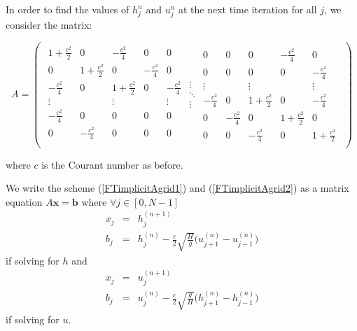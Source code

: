 \documentclass[a4paper,12pt, notitlepage]{article}
\begin{document}
In order to find the values of $h_{j}^{n}$ and $u_{j}^{n}$ at the next time iteration for all $j$, we consider the matrix:

\[
A = \left (
\begin{array}{ccc}
\begin{array}{ccccc}
1 + \frac{c^{2}}{2} & 0 & -\frac{c^{2}}{4} & 0 & 0\\
0& 1 + \frac{c^{2}}{2} & 0 & -\frac{c^{2}}{4} & 0\\
-\frac{c^{2}}{4} & 0& 1 + \frac{c^{2}}{2} & 0 & -\frac{c^{2}}{4}\\
\vdots & & \vdots & & \vdots\\
- \frac{c^{2}}{4} & 0 & 0 & 0 & 0\\
0 & - \frac{c^{2}}{4} & 0 & 0 & 0\\
\end{array}
\begin{array}{c}
\vdots\\ 
\ddots\\
\vdots
\end{array}
\begin{array}{ccccc}
0 & 0 & 0 & - \frac{c^{2}}{4} & 0\\
0 & 0 & 0 & 0 & - \frac{c^{2}}{4}\\
\vdots & & \vdots & & \vdots\\
-\frac{c^{2}}{4}& 0 & 1 + \frac{c^{2}}{2} & 0 & -\frac{c^{2}}{4} \\
0 & -\frac{c^{2}}{4} & 0 & 1 + \frac{c^{2}}{2} & 0\\
0 & 0 & -\frac{c^{2}}{4}& 0 & 1 + \frac{c^{2}}{2}
\end{array}
\end{array}
\right )
\]

where $c$ is the Courant number as before. 

We write the scheme (\ref{FTimplicitAgrid1}) and (\ref{FTimplicitAgrid2}) as a matrix equation $A \mathbf{x} = \mathbf{b}$ where $\forall j \in [0, N-1]$
\begin{eqnarray}
x_{j} & = & h_{j}^{(n+1)}\\
b_{j} & = & h_{j}^{(n)} - \frac{c}{2}\sqrt{\frac{H}{g}}\bigg(u_{j+1}^{(n)} - u_{j-1}^{(n)}\bigg)
\end{eqnarray}
if solving for $h$ and
\begin{eqnarray}
x_{j} & = & u_{j}^{(n+1)}\\
b_{j} & = & u_{j}^{(n)} - \frac{c}{2}\sqrt{\frac{g}{H}}\bigg(h_{j+1}^{(n)} - h_{j-1}^{(n)}\bigg) 
\end{eqnarray}
if solving for $u$.
\end{document}
